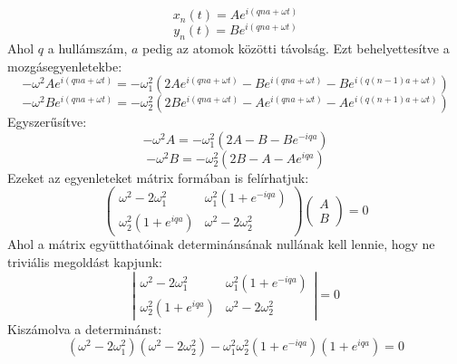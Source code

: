 \documentclass[a4paper,12pt]{article}
\begin{document}
\begin{equation}
    x_n(t) = A e^{i (q n a + \omega t)}
\end{equation}
\begin{equation}
    y_n(t) = B e^{i (q n a + \omega t)}
\end{equation}
Ahol $q$ a hullámszám, $a$ pedig az atomok közötti távolság. Ezt behelyettesítve a mozgásegyenletekbe:
\begin{equation}
    -\omega^2 A e^{i (q n a + \omega t)} = -\omega_1^2 \left( 2A e^{i (q n a + \omega t)} - B e^{i (q n a + \omega t)} - B e^{i (q (n-1) a + \omega t)} \right)
\end{equation}
\begin{equation}
    -\omega^2 B e^{i (q n a + \omega t)} = -\omega_2^2 \left( 2B e^{i (q n a + \omega t)} - A e^{i (q n a + \omega t)} - A e^{i (q (n+1) a + \omega t)} \right)
\end{equation}
Egyszerűsítve:
\begin{equation}
    -\omega^2 A = -\omega_1^2 \left( 2A - B - B e^{-i q a} \right)
\end{equation}
\begin{equation}
    -\omega^2 B = -\omega_2^2 \left( 2B - A - A e^{i q a} \right)
\end{equation}
Ezeket az egyenleteket mátrix formában is felírhatjuk:
\begin{equation}
    \begin{pmatrix}
    \omega^2 - 2\omega_1^2 & \omega_1^2 (1 + e^{-i q a}) \\
    \omega_2^2 (1 + e^{i q a}) & \omega^2 - 2\omega_2^2
    \end{pmatrix}
    \begin{pmatrix}
    A \\
    B
    \end{pmatrix}
    = 0
\end{equation}
Ahol a mátrix együtthatóinak determinánsának nullának kell lennie, hogy ne triviális megoldást kapjunk:
\begin{equation}
    \left| \begin{matrix}
    \omega^2 - 2\omega_1^2 & \omega_1^2 (1 + e^{-i q a}) \\
    \omega_2^2 (1 + e^{i q a}) & \omega^2 - 2\omega_2^2
    \end{matrix} \right| = 0
\end{equation}
Kiszámolva a determinánst:
\begin{equation}
    (\omega^2 - 2\omega_1^2)(\omega^2 - 2\omega_2^2) - \omega_1^2 \omega_2^2 (1 + e^{-i q a})(1 + e^{i q a}) = 0
\end{equation}
\end{document}
